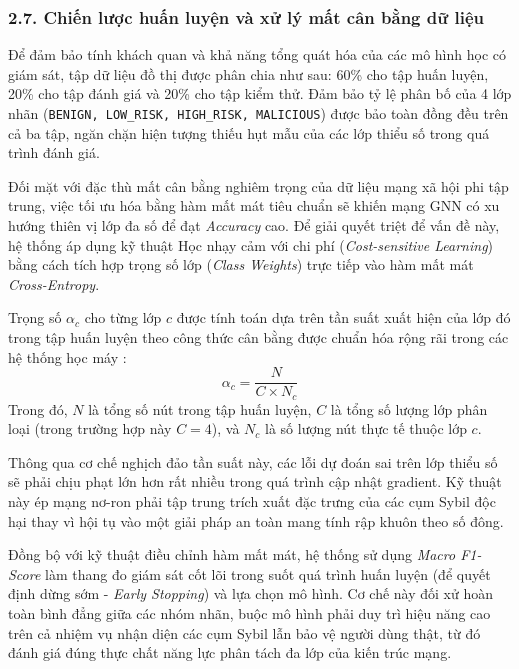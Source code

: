 \subsubsection{2.7. Chiến lược huấn luyện và xử lý mất cân bằng dữ liệu}

\indent\indent Để đảm bảo tính khách quan và khả năng tổng quát hóa của các mô hình học có giám sát, tập dữ liệu đồ thị được phân chia như sau: 60\% cho tập huấn luyện, 20\% cho tập đánh giá và 20\% cho tập kiểm thử. Đảm bảo tỷ lệ phân bố của 4 lớp nhãn (\texttt{BENIGN, LOW\_RISK, HIGH\_RISK, MALICIOUS}) được bảo toàn đồng đều trên cả ba tập, ngăn chặn hiện tượng thiếu hụt mẫu của các lớp thiểu số trong quá trình đánh giá.\vspace{0.3cm}

Đối mặt với đặc thù mất cân bằng nghiêm trọng của dữ liệu mạng xã hội phi tập trung, việc tối ưu hóa bằng hàm mất mát tiêu chuẩn sẽ khiến mạng GNN có xu hướng thiên vị lớp đa số để đạt \textit{Accuracy} cao. Để giải quyết triệt để vấn đề này, hệ thống áp dụng kỹ thuật Học nhạy cảm với chi phí (\textit{Cost-sensitive Learning}) \cite{he2009learning} bằng cách tích hợp trọng số lớp (\textit{Class Weights}) trực tiếp vào hàm mất mát \textit{Cross-Entropy}.\vspace{0.3cm}

Trọng số $\alpha_c$ cho từng lớp $c$ được tính toán dựa trên tần suất xuất hiện của lớp đó trong tập huấn luyện theo công thức cân bằng được chuẩn hóa rộng rãi trong các hệ thống học máy \cite{pedregosa2011scikit}:
\[
    \alpha_c = \frac{N}{C \times N_c}
\]
Trong đó, $N$ là tổng số nút trong tập huấn luyện, $C$ là tổng số lượng lớp phân loại (trong trường hợp này $C=4$), và $N_c$ là số lượng nút thực tế thuộc lớp $c$. 

Thông qua cơ chế nghịch đảo tần suất này, các lỗi dự đoán sai trên lớp thiểu số sẽ phải chịu phạt lớn hơn rất nhiều trong quá trình cập nhật gradient. Kỹ thuật này ép mạng nơ-ron phải tập trung trích xuất đặc trưng của các cụm Sybil độc hại thay vì hội tụ vào một giải pháp an toàn mang tính rập khuôn theo số đông.\vspace{0.3cm}

Đồng bộ với kỹ thuật điều chỉnh hàm mất mát, hệ thống sử dụng \textit{Macro F1-Score} \cite{sokolova2009systematic} làm thang đo giám sát cốt lõi trong suốt quá trình huấn luyện (để quyết định dừng sớm - \textit{Early Stopping}) và lựa chọn mô hình. Cơ chế này đối xử hoàn toàn bình đẳng giữa các nhóm nhãn, buộc mô hình phải duy trì hiệu năng cao trên cả nhiệm vụ nhận diện các cụm Sybil lẫn bảo vệ người dùng thật, từ đó đánh giá đúng thực chất năng lực phân tách đa lớp của kiến trúc mạng.
